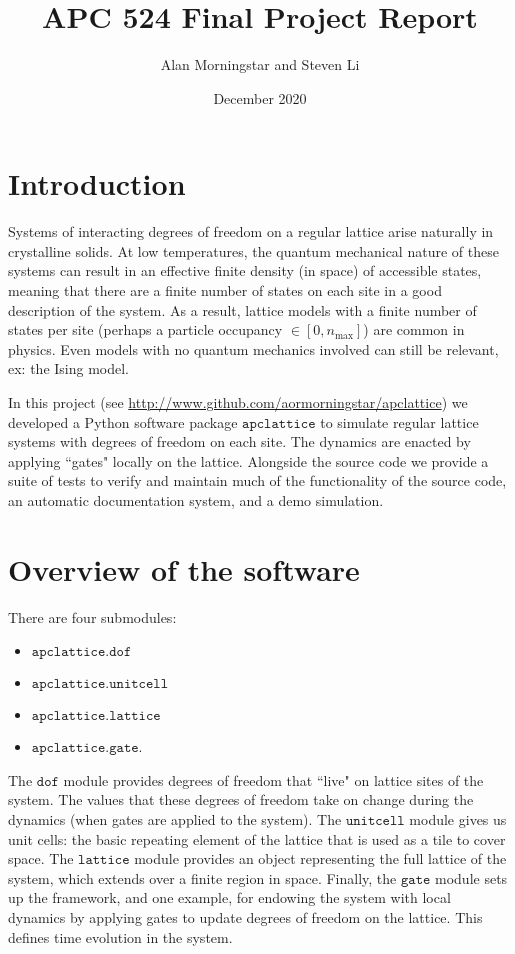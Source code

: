 \documentclass{article}
\title{APC 524 Final Project Report}
\author{Alan Morningstar and Steven Li}
\date{December 2020}
\begin{document}
\maketitle

\section{Introduction}

Systems of interacting degrees of freedom on a regular lattice arise naturally in crystalline solids. At low temperatures, the quantum mechanical nature of these systems can result in an effective finite density (in space) of accessible states, meaning that there are a finite number of states on each site in a good description of the system. As a result, lattice models with a finite number of states per site (perhaps a particle occupancy $\in [0, n_\mathrm{max}]$) are common in physics. Even models with no quantum mechanics involved can still be relevant, ex: the Ising model.

In this project (see \url{http://www.github.com/aormorningstar/apclattice}) we developed a Python software package $\texttt{apclattice}$ to simulate regular lattice systems with degrees of freedom on each site. The dynamics are enacted by applying ``gates" locally on the lattice. Alongside the source code we provide a suite of tests to verify and maintain much of the functionality of the source code, an automatic documentation system, and a demo simulation.

\section{Overview of the software}
There are four submodules:
\begin{itemize}
    \item $\texttt{apclattice.dof}$\\
    \item $\texttt{apclattice.unitcell}$\\
    \item $\texttt{apclattice.lattice}$\\
    \item $\texttt{apclattice.gate}$.
\end{itemize}
The $\texttt{dof}$ module provides degrees of freedom that ``live" on lattice sites of the system. The values that these degrees of freedom take on change during the dynamics (when gates are applied to the system). The $\texttt{unitcell}$ module gives us unit cells: the basic repeating element of the lattice that is used as a tile to cover space. The $\texttt{lattice}$ module provides an object representing the full lattice of the system, which extends over a finite region in space. Finally, the $\texttt{gate}$ module sets up the framework, and one example, for endowing the system with local dynamics by applying gates to update degrees of freedom on the lattice. This defines time evolution in the system.
\end{document}
